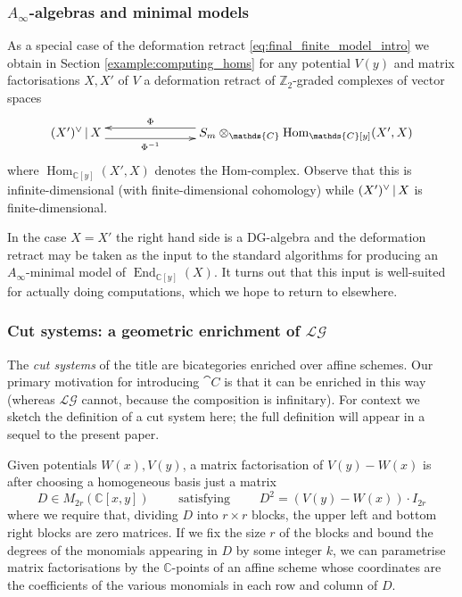 \documentclass[english,letter paper,12pt,leqno]{article}
\theoremstyle{example}
\numberwithin{equation}{section}
\def\LG{\mathcal{LG}}
\def\Hom{\operatorname{Hom}}
\def\be{\begin{equation}}
\def\ee{\end{equation}}
\def\nZ{\mathds{Z}}
\def\nC{\mathds{C}}
\DeclareMathOperator{\End}{End}
\begin{document}
\subsubsection{$A_\infty$-algebras and minimal models}

As a special case of the deformation retract \eqref{eq:final_finite_model_intro} we obtain in Section \ref{example:computing_homs} for any potential $V(y)$ and matrix factorisations $X,X'$ of $V$ a deformation retract of $\nZ_2$-graded complexes of vector spaces
\begin{equation}\label{eq:final_finite_model_hom}
\xymatrix@C+4pc{
(X')^{\vee} \l X \ar@<-1ex>[r]_-{\Phi^{-1}} & S_m \otimes_{\nC} \Hom_{\nC[y]}(X', X) \ar@<-1ex>[l]_-{\Phi}
}
\end{equation}
where $\Hom_{\nC[y]}(X',X)$ denotes the Hom-complex. Observe that this is infinite-dimensional (with finite-dimensional cohomology) while $(X')^{\vee} \,|\, X$ is finite-dimensional.

In the case $X = X'$ the right hand side is a DG-algebra and the deformation retract may be taken as the input to the standard algorithms for producing an $A_\infty$-minimal model of $\End_{\nC[y]}(X)$. It turns out that this input is well-suited for actually doing computations, which we hope to return to elsewhere.

\subsubsection{Cut systems: a geometric enrichment of $\LG$}

The \emph{cut systems} of the title are bicategories enriched over affine schemes. Our primary motivation for introducing $\cat{C}$ is that it can be enriched in this way (whereas $\LG$ cannot, because the composition is infinitary). For context we sketch the definition of a cut system here; the full definition will appear in a sequel to the present paper.

Given potentials $W(x), V(y)$, a matrix factorisation of $V(y) - W(x)$ is after choosing a homogeneous basis just a matrix
\be\label{eq:intro_capitalD}
D \in M_{2r}( \nC[x,y] ) \qquad \text{ satisfying } \qquad D^2 = (V(y) - W(x)) \cdot I_{2r}
\ee
where we require that, dividing $D$ into $r \times r$ blocks, the upper left and bottom right blocks are zero matrices. If we fix the size $r$ of the blocks and bound the degrees of the monomials appearing in $D$ by some integer $k$, we can parametrise matrix factorisations by the $\nC$-points of an affine scheme whose coordinates are the coefficients of the various monomials in each row and column of $D$. 
\end{document}
